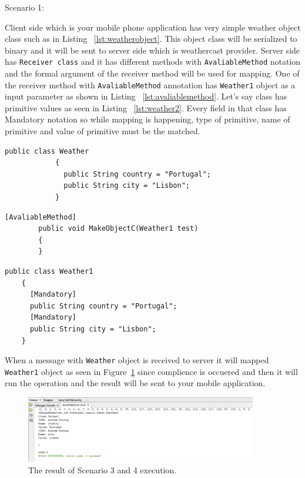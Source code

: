 Scenario 1:

Client side which is your mobile phone application has very simple weather object class such as in Listing ~\ref{lst:weatherobject}. This object class will be serialized to binary and it will be sent to server side which is weathercast provider. Server side has {\tt Receiver class}   and it has different methods with {\tt AvaliableMethod} notation and the formal argument of the receiver method will be used for mapping. One of the receiver method with {\tt AvaliableMethod} annotation has {\tt Weather1} object as a input parameter as shown in Listing ~\ref{lst:avaliablemethod}. Let's say  class has primitive values as seen in Listing ~\ref{lst:weather2}. Every field in that class has Mandatory notation so while mapping is happening, type of primitive, name of primitive and value of primitive must be the matched.

\begin{lstlisting}[caption=Simple weather object class, label=lst:weatherobject]
          public class Weather
            {
              public String country = "Portugal";
              public String city = "Lisbon";
            }

\end{lstlisting}

\begin{lstlisting}[caption=AvaliableMethod notation in Receiver Class, label=lst:weather2]
        [AvaliableMethod]
        public void MakeObjectC(Weather1 test)
        {
        }
\end{lstlisting}

\begin{lstlisting}[caption=Weather1 object in Receiver, label=lst:avaliablemethod]
  public class Weather1
    {
      [Mandatory]
      public String country = "Portugal";
      [Mandatory]
      public String city = "Lisbon";
    }
\end{lstlisting}

When a message with {\tt Weather} object is received to server it will mapped {\tt Weather1} object as seen in Figure~\ref{fig:scenaro3} since complience is occuered and then it will run the operation and the result will be sent to your mobile application.
\begin{figure}[!htb]
  \centering
  \includegraphics[width=0.9\textwidth]{Figures/scenario4.png}
  \caption[The result of Scenario 1,3 and 4 execution.]{The result of Scenario 3 and 4 execution.}
  \label{fig:scenaro3}
\end{figure}

